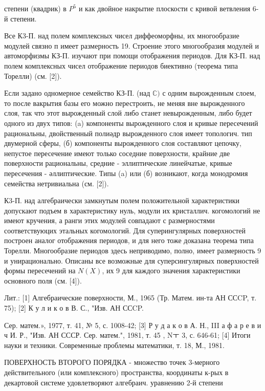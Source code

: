 \documentclass[10pt]{article}
\begin{document}
степени (квадрик) в $P^{5}$ и как двойное накрытие плоскости с кривой ветвления 6-й степени.



Все К3-П. над полем комплексных чисел диффеоморфны, их многообразие модулей связно п имеет размерность 19. Строение этого многообразия модулей и автоморфизмы КЗ-П. изучают при помощи отображения периодов. Для КЗ-П. над полем комплексных чисел отображение периодов биективно (теорема типа Торелли) (см. [2]).



Если задано одномерное семейство КЗ-П. (над $\mathbb{C})$ с одним вырожденным слоем, то после вакрытия базы его можно перестроить, не меняя вне вырожденного слоя, так что этот вырожденный слой либо станет невырожденным, либо будет одного из двух типов: (a) компоненты вырожденного слоя и кривые пересечений рациональны, двойственный полиәдр вырожденного слоя имеет топологич. тип двумерной сферы, (б) компоненты вырожденного слоя составляют цепочку, непустое пересечение имеют только соседние поверхности, крайние две поверхности рациональны, средние - эллиптические линейчатые, кривые пересечения - әллиптические. Типы (a) или (б) возникают, когда монодромия семейства нетривиальна (см. [2]).



К3-П. над алгебраически замкнутым полем положительной характеристики допускают подъем в характеристику нуль, модули их кристаллич. когомологий не имеют кручения, а ранги этих модулей совпадают с размерностями соответствуюцих этальных когомологий. Для суперингулярных поверхностей построен аналог отображения периодов, и для него тоже доказана теорема типа Торелли. Многообразие периодов здесь неприводимо, полно, имеет размерность 9 и унирационально. Описаны все возможные для суперсингулярных поверхностей формы пересечений на $N(X)$, их 9 для каждого значения характеристики основного поля (см. [4]).



Лит.: [1] Алгебраические поверхности, М., 1965 (Тр. Матем. ин-та АН ССCP, т. 75); [2] К у л и к о в В. С., "Изв. АН ССCP.

Сер. матем.», 1977, т. 41, № 5, с. 1008-42; [3] Р у д а к о в А. Н., III а ф а р е в и ч И. Р., "Изв. АН СССР. Сер. матем.", 1981, т. 45 , Nㅜ 3, с. 646-61; [4] Итоги науки и техники. Современные проблемы математики, т. 18, М., 1981.

ПОВЕРХНОСТЬ ВТОРОГО ПОРЯДКА - множество точек 3-мерного действительного (или комплексного) пространства, координаты к-рых в декартовой системе удовлетворяют алгебраич. уравнению 2-й степени
\end{document}
